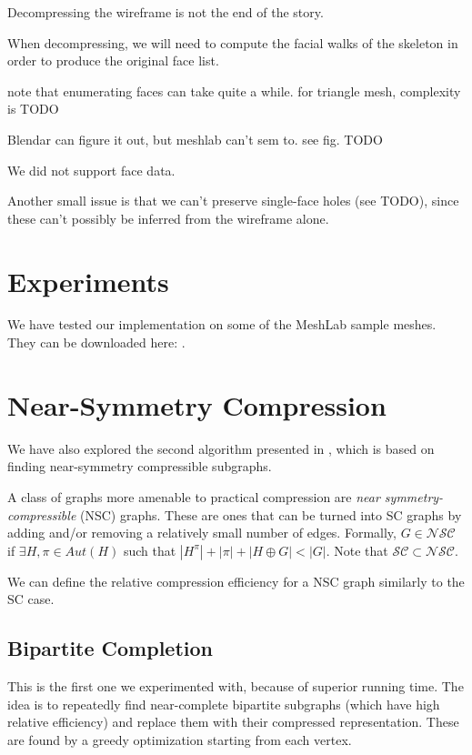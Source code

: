 \documentclass{egpubl}
\begin{document}
Decompressing the wireframe is not the end of the story.

When decompressing, we will need to compute the facial walks of the skeleton in order to produce the original face list.

note that enumerating faces can take quite a while. for triangle mesh, complexity is TODO %

Blendar can figure it out, but meshlab can't sem to. see fig. TODO

We did not support face data.

Another small issue is that we can't preserve single-face holes (see TODO), since these can't possibly be inferred from the wireframe alone.

\section{Experiments}

We have tested our implementation on some of the MeshLab sample meshes. They can be downloaded here: .

\section{Near-Symmetry Compression}

We have also explored the second algorithm presented in \cite{cibej2021automorphisms}, which is based on finding near-symmetry compressible subgraphs.

A class of graphs more amenable to practical compression are \textit{near symmetry-compressible} (NSC) graphs. These are ones that can be turned into SC graphs by adding and/or removing a relatively small number of edges.
Formally, $G \in \mathcal{N}\mathcal{S}\mathcal{C}$ if $\exists H, \pi \in Aut(H)$ such that $|H^\pi| + |\pi| + |H \oplus G| < |G|$. Note that $\mathcal{S}\mathcal{C} \subset \mathcal{N}\mathcal{S}\mathcal{C}$.

We can define the relative compression efficiency for a NSC graph similarly to the SC case.

\subsection{Bipartite Completion}

This is the first one we experimented with, because of superior running time.
The idea is to repeatedly find near-complete bipartite subgraphs (which have high relative efficiency) and replace them with their compressed representation. These are found by a greedy optimization starting from each vertex.
\end{document}
